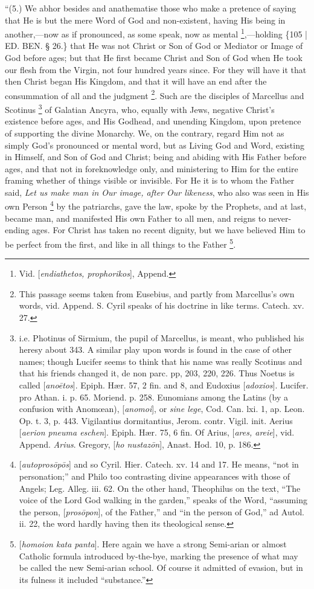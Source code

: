 ``(5.) We abhor besides and
anathematise those who make a pretence of saying that He is but the
mere Word of God and non-existent, having His being in another,—now
as if pronounced, as some speak, now as mental \footnote{Vid. [\emph{endiathetos, prophorikos}], Append.},—holding \{105 | ED.
BEN.
§ 26.\} that He was not Christ or Son of God or Mediator or Image of
God before ages; but that He first became Christ and Son of God when
He took our flesh from the Virgin, not four hundred years since. For
they will have it that then Christ began His Kingdom, and that it will
have an end after the consummation of all and the judgment \footnote{This passage seems taken from Eusebius, and partly from Marcellus's
own words, vid. Append. S. Cyril speaks of his doctrine in like terms.
Catech. xv. 27.}. Such are the disciples of Marcellus and Scotinus \footnote{i.e. Photinus of Sirmium, the pupil of Marcellus, is meant, who
published his heresy about 343. A similar play upon words is found in
the case of other names; though Lucifer seems to think that his name
was really Scotinus and that his friends changed it, de non parc. pp,
203, 220, 226. Thus Noetus is called [\emph{ano\={e}tos}]. Epiph. Hær.
57, 2 fin. and 8, and Eudoxius [\emph{adoxios}]. Lucifer. pro Athan. i.
p. 65. Moriend. p. 258. Eunomians among the Latins (by a confusion
with Anomœan), [\emph{anomoi}], or \emph{sine lege}, Cod. Can. lxi.
1, ap. Leon. Op. t. 3, p. 443. Vigilantius dormitantius, Jerom. contr.
Vigil. init. Aerius [\emph{aerion pneuma eschen}]. Epiph. Hær. 75, 6
fin. Of Arius, [\emph{ares, areie}], vid. Append. \emph{Arius}.
Gregory, [\emph{ho nustaz\={o}n}], Anast. Hod. 10, p. 186.} of Galatian Ancyra, who, equally with Jews, negative Christ's
existence before ages, and His Godhead, and unending Kingdom, upon
pretence of supporting the divine Monarchy. We, on the contrary,
regard Him not as simply God's pronounced or mental word, but as
Living God and Word, existing in Himself, and Son of God and Christ;
being and abiding with His Father before ages, and that not in
foreknowledge only, and ministering to Him for the entire framing
whether of things visible or invisible. For He it is to whom the
Father said, \emph{Let us make man in Our image, after Our likeness},
who also was seen in His own Person \footnote{[\emph{autopros\={o}p\={o}s}] and so Cyril. Hier. Catech. xv. 14
and 17. He means, ``not in personation;'' and Philo too contrasting
divine appearances with those of Angels; Leg. Alleg. iii. 62. On the
other hand, Theophilus on the text, ``The voice of the Lord God walking
in the garden,'' speaks of the Word, ``assuming the person, [\emph{pros\={o}pon}],
of the Father,'' and ``in the person of God,'' ad Autol. ii. 22, the word
hardly having then its theological sense.} by the patriarchs, gave the law, spoke by the Prophets,
and at last, became man, and manifested His own Father to all men, and
reigns to never-ending ages. For Christ has taken no recent dignity,
but we have believed Him to be perfect from the first, and like in all
things to the Father \footnote{[\emph{homoion kata panta}]. Here again we have a strong Semi-arian or
almost Catholic formula introduced by-the-bye, marking the presence of
what may be called the new Semi-arian school. Of course it admitted of
evasion, but in its fulness it included ``substance.''}.

